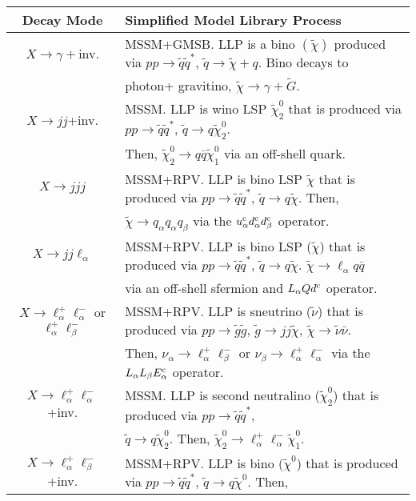 \begin{table}
\begin{center}
\begin{tabular}{ |c|l|} 
 \hline
Decay Mode & Simplified Model Library Process \\
\hline\hline
$X\rightarrow \gamma+$inv. & MSSM+GMSB. LLP is a bino $(\tilde\chi)$ produced via $pp\rightarrow \tilde{q}\tilde{q}^*$, $\tilde{q}\rightarrow \tilde\chi+q$. Bino decays to   \\
&     photon+ gravitino, $\tilde\chi\rightarrow \gamma+\tilde{G}$. \\
\hline
$X\rightarrow jj$+inv.& MSSM. LLP is wino LSP $\tilde\chi_2^0$ that is produced via $pp\rightarrow \tilde q\tilde q^*$, $\tilde{q}\rightarrow q\tilde{\chi}_2^0$.    \\
&  Then,  $\tilde\chi_2^0\rightarrow q\bar{q}\tilde\chi_1^0$ via an   off-shell quark.\\
\hline
$X\rightarrow jjj$ & MSSM+RPV. LLP is bino LSP $\tilde\chi$ that is produced via $pp\rightarrow \tilde q\tilde q^*$, $\tilde{q}\rightarrow q\tilde{\chi}$. Then,   \\
& $\tilde\chi\rightarrow q_\alpha q_\alpha q_\beta$  via the $u_\alpha^{\rm c}d_\alpha^{\rm c}d_\beta^{\rm c}$ operator.\\
\hline
$X\rightarrow jj \ell_\alpha$ & MSSM+RPV. LLP is bino LSP ($\tilde\chi$) that is produced via $pp\rightarrow \tilde q\tilde q^*$, $\tilde q\rightarrow q\tilde \chi$. $\tilde\chi\rightarrow \ell_\alpha q\bar q$  \\
&   via an off-shell sfermion and $L_\alpha Qd^{\rm c}$ operator.\\
\hline
$X\rightarrow \ell_\alpha^+\ell_\alpha^-$ or $\ell_\alpha^+\ell_\beta^-$ & MSSM+RPV. LLP is sneutrino ($\tilde \nu$) that is produced via $pp\rightarrow \tilde{g}\tilde g$, $\tilde g\rightarrow jj \tilde\chi$, $\tilde\chi\rightarrow \tilde\nu \bar\nu$. \\
&  Then, $\nu_\alpha\rightarrow \ell_\alpha^+\ell_\beta^-$ or $\nu_\beta\rightarrow \ell_\alpha^+\ell_\alpha^-$ via the $L_\alpha L_\beta E_\alpha^{\rm c}$ operator. \\
\hline
$X\rightarrow \ell_\alpha^+\ell_\alpha^-$+inv.& MSSM. LLP is second neutralino ($\tilde \chi_2^0$) that is produced via $pp\rightarrow \tilde{q}\tilde q^*$,   \\
 &  $\tilde q\rightarrow q\tilde\chi_2^0$. Then, $\tilde\chi_2^0\rightarrow \ell_\alpha^+\ell_\alpha^- \tilde\chi_1^0$.  \\
 \hline
 $X\rightarrow \ell_\alpha^+\ell_\beta^-$+inv.& MSSM+RPV. LLP is bino ($\tilde \chi^0$) that is produced via $pp\rightarrow \tilde{q}\tilde q^*$, $\tilde q\rightarrow q\tilde\chi^0$. Then,  \\

\end{tabular}
\end{center}
\end{table}
